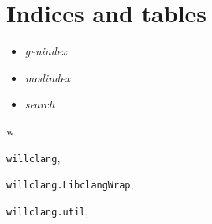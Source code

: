 \documentclass[letterpaper,10pt,english]{sphinxmanual}
\begin{document}
\chapter{Indices and tables}
\label{index:indices-and-tables}\begin{itemize}
\item {} 
\emph{genindex}

\item {} 
\emph{modindex}

\item {} 
\emph{search}

\end{itemize}


\renewcommand{\indexname}{Python Module Index}
\begin{theindex}
\def\bigletter#1{{\Large\sffamily#1}\nopagebreak\vspace{1mm}}
\bigletter{w}
\item {\texttt{willclang}}, \pageref{code:module-willclang}
\item {\texttt{willclang.LibclangWrap}}, \pageref{code:module-willclang.LibclangWrap}
\item {\texttt{willclang.util}}, \pageref{code:module-willclang.util}
\end{theindex}

\renewcommand{\indexname}{Index}
\printindex
\end{document}
